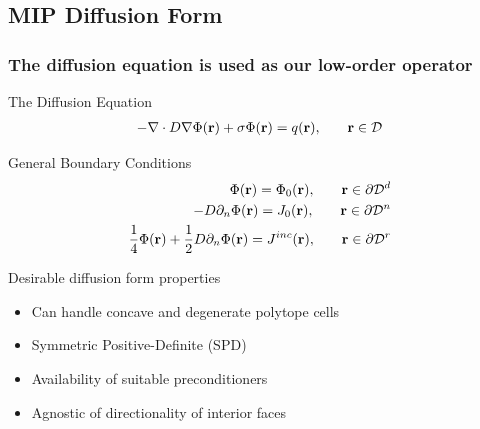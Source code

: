 \documentclass[compress,10pt]{beamer}
\begin{document}
\subsection{MIP Diffusion Form}
\typeout{***********************************************************************************}
\begin{frame}[t]\frametitle{The diffusion equation is used as our low-order operator}
	\begin{block}{The Diffusion Equation}\vspace{-0.25cm} {\small 
     		\begin{align*}
 	 		{ \small -{\bf \nabla} \cdot D {\bf \nabla} \Phi ({\bf r}) + \sigma \Phi ({\bf r}) = q ({\bf r}), \qquad  {\bf r} \in \mathcal{D} }
        	\end{align*} }\vspace{-0.25cm}
        	\end{block}
        	\begin{block}{General Boundary Conditions} \vspace{-0.4cm} {\small 
		\begin{align*}
 	 		{ \small \Phi ({\bf r})  = \Phi_0 ({\bf r}) , \qquad {\bf r} \in \partial \mathcal{D}^d } \\
 	 		{ \small -D \partial_n \Phi ({\bf r})  = J_0 ({\bf r}) , \qquad {\bf r} \in \partial \mathcal{D}^n } \\
 	 		{ \small \frac{1}{4} \Phi ({\bf r})  + \frac{1}{2}D \partial_n \Phi ({\bf r})  = J^{inc} ({\bf r}) ,  \qquad {\bf r} \in \partial \mathcal{D}^r}
        		\end{align*} } \vspace{-0.25cm}
    \end{block}
	\begin{block}{Desirable diffusion form properties} {\small 
	\begin{itemize}
		\item Can handle concave and degenerate polytope cells
		\item Symmetric Positive-Definite (SPD) 
		\item Availability of suitable preconditioners
		\item Agnostic of directionality of interior faces
	\end{itemize} }
	\end{block}
\end{frame}
\end{document}
